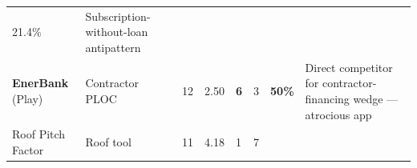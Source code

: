 \documentclass[
  10pt,
]{article}
\begin{document}
\begin{longtable}[]{@{}llllllll@{}}
\begin{minipage}[t]{0.10\columnwidth}
21.4\%\strut
\end{minipage} & \begin{minipage}[t]{0.10\columnwidth}\raggedright
Subscription-without-loan antipattern\strut
\end{minipage}\tabularnewline
\begin{minipage}[t]{0.10\columnwidth}\raggedright
\textbf{EnerBank} (Play)\strut
\end{minipage} & \begin{minipage}[t]{0.10\columnwidth}\raggedright
Contractor PLOC\strut
\end{minipage} & \begin{minipage}[t]{0.10\columnwidth}\raggedright
12\strut
\end{minipage} & \begin{minipage}[t]{0.10\columnwidth}\raggedright
2.50\strut
\end{minipage} & \begin{minipage}[t]{0.10\columnwidth}\raggedright
\textbf{6}\strut
\end{minipage} & \begin{minipage}[t]{0.10\columnwidth}\raggedright
3\strut
\end{minipage} & \begin{minipage}[t]{0.10\columnwidth}\raggedright
\textbf{50\%}\strut
\end{minipage} & \begin{minipage}[t]{0.10\columnwidth}\raggedright
Direct competitor for contractor-financing wedge --- atrocious app\strut
\end{minipage}\tabularnewline
\begin{minipage}[t]{0.10\columnwidth}\raggedright
Roof Pitch Factor\strut
\end{minipage} & \begin{minipage}[t]{0.10\columnwidth}\raggedright
Roof tool\strut
\end{minipage} & \begin{minipage}[t]{0.10\columnwidth}\raggedright
11\strut
\end{minipage} & \begin{minipage}[t]{0.10\columnwidth}\raggedright
4.18\strut
\end{minipage} & \begin{minipage}[t]{0.10\columnwidth}\raggedright
1\strut
\end{minipage} & \begin{minipage}[t]{0.10\columnwidth}\raggedright
7\strut
\end{minipage} & \begin{minipage}[t]{0.10\columnwidth}\raggedright

\end{minipage}
\end{longtable}
\end{document}
